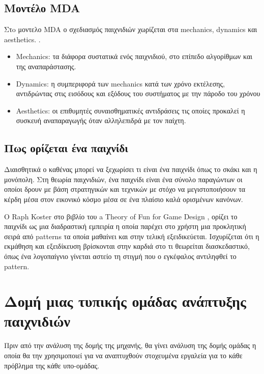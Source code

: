 	\subsection{Μοντέλο MDA}
	Στo μοντελο \gls{MDA} ο σχεδιασμός παιχνιδιών χωρίζεται στα mechanics, dynamics και aesthetics.
	\cite{mda04}.
	\begin{itemize}
	\item Mechanics: τα διάφορα συστατικά ενός παιχνιδιού, στο επίπεδο αλγορίθμων και της αναπαράστασης.
	\item Dynamics: η συμπεριφορά των mechanics κατά των χρόνο εκτέλεσης, αντιδρώντας στις εισόδους και εξόδους του συστήματος με την πάροδο του χρόνου
	\item Aesthetics: οι επιθυμητές συναισθηματικές αντιδράσεις τις οποίες προκαλεί η συσκευή αναπαραγωγής όταν αλληλεπιδρά με τον παίχτη.	
	\end{itemize}

\subsection{Πως ορίζεται ένα παιχνίδι}
Διαισθητικά ο καθένας μπορεί να ξεχωρίσει τι είναι ένα παιχνίδι όπως το σκάκι και η μονόπολη. Στη θεωρία παιχνιδιών, ένα παιχνίδι είναι ένα σύνολο παραγώντων οι οποίοι δρουν με βάση στρατηγικών και τεχνικών με στόχο να μεγιστοποιήσουν τα κέρδη μέσα στον εικονικό κόσμο μέσα σε ένα πλαίσιο καλά ορισμένων κανόνων.

Ο Raph Koster στο βιβλίο του a Theory of Fun for Game Design \cite{koster04}, ορίζει το παιχνίδι ως μια διαδραστική εμπειρία η οποία παρέχει στο χρήστη μια προκλητική σειρά από patterns τα οποία μαθαίνει και στην τελική εξειδικεύεται. Ισχυρίζεται ότι η εκμάθηση και εξειδίκευση βρίσκονται στην καρδιά στο τι θεωρείται διασκεδαστικό, όπως ένα λογοπαίγνιο γίνεται αστείο τη στιγμή που ο εγκέφαλος αντιληφθεί το pattern.

\section{Δομή μιας τυπικής ομάδας ανάπτυξης παιχνιδιών}
	Πριν από την ανάλυση της δομής της μηχανής, θα γίνει ανάλυση της δομής ομάδας η οποία θα την χρησιμοποιεί για να αναπτυχθούν στοχευμένα εργαλεία για το κάθε πρόβλημα της κάθε υπο-ομάδας.
	

